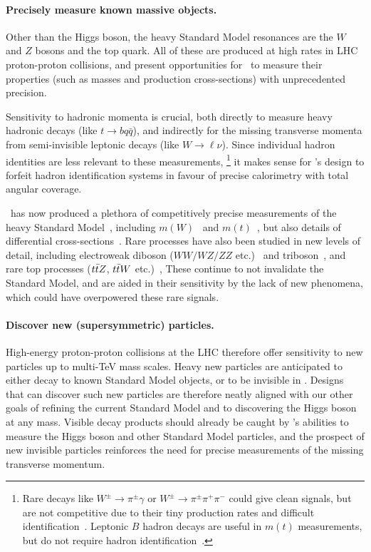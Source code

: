 \paragraph{Precisely measure known massive objects.}
Other than the Higgs boson, the heavy Standard Model resonances are the
$W$ and $Z$ bosons and the top quark.
All of these are produced at high rates in LHC proton-proton collisions,
and present opportunities for \atlas\ to measure their properties
(such as masses and production cross-sections) with unprecedented precision.

Sensitivity to hadronic momenta is crucial,
both directly to measure heavy hadronic decays
(like $t \to bq\bar{q}$),
and indirectly for the missing transverse momenta from semi-invisible
leptonic decays (like $W \to \ell\nu$).
Since individual hadron identities are less relevant to these measurements,%
\footnote{%
Rare decays like
$W^\pm \to \pi^\pm \gamma$ or $W^\pm \to \pi^\pm \pi^+ \pi^-$
could give clean signals, but are not competitive due to their
tiny production rates and difficult identification~\cite{
cdf1996search,
mangano2014wpiy,
cms2021wpiy
}.
Leptonic $B$ hadron decays are useful in $m(t)$ measurements, but do not
require hadron identification~\cite{
CDF:2009mbf,
CMS:2016ixg,
ATLAS:2022jbw
}.%
}
it makes sense for \atlas's design to forfeit hadron identification systems
in favour of precise calorimetry with total angular coverage.

\atlas\ has now produced a plethora of competitively precise measurements
of the heavy Standard Model~\cite{atlas2021summarysm},
including $m(W)$~\cite{atlas2018wmass} and
$m(t)$~\cite{atlas2022symmarytop, atlas2019topmass, TOPQ-2015-03},
but also details of differential cross-sections~\cite{
STDM-2016-11,
STDM-2016-14,
TOPQ-2018-15,
TOPQ-2016-10
}.
Rare processes have also been studied in new levels of detail,
including
electroweak diboson ($WW/WZ/ZZ$ etc.)~\cite{
STDM-2015-21,
STDM-2015-23,
STDM-2017-09
}
and triboson~\cite{
STDM-2016-06,
STDM-2017-22,
STDM-2019-09
},
and rare top processes
($t\bar t Z$, $t\bar t W$ etc.)~\cite{
TOPQ-2013-05,
TOPQ-2018-01,
TOPQ-2020-03
},
These continue to not invalidate the Standard Model, and are aided in their
sensitivity by the lack of new phenomena,
which could have overpowered these rare signals.

\paragraph{Discover new (supersymmetric) particles.}
High-energy proton-proton collisions at the LHC therefore offer sensitivity
to new particles up to multi-TeV mass scales.
Heavy new particles are anticipated to either decay to known Standard Model
objects, or to be invisible in \atlas.
Designs that can discover such new particles are therefore neatly aligned with
our other goals of refining the current Standard Model
and to discovering the Higgs boson at any mass.
Visible decay products should already be caught by \atlas's abilities
to measure the Higgs boson and other Standard Model particles,
and the prospect of new invisible particles reinforces the need for precise
measurements of the missing transverse momentum.

